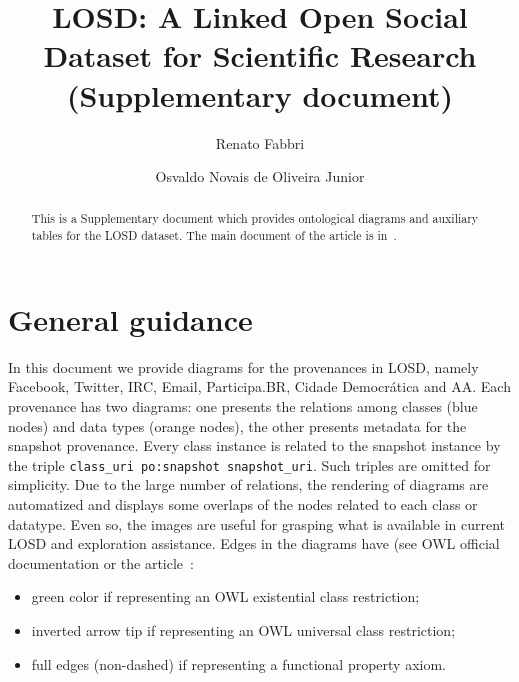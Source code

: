 \documentclass[review]{elsarticle}
\newcommand{\te}[1] {\texttt{\footnotesize#1}}
\begin{document}
%
\begin{frontmatter}
%
\title{LOSD: A Linked Open Social Dataset for Scientific Research
  (Supplementary document)}
%
\author[pwa]{Renato Fabbri}
%
\author[pwr]{Osvaldo Novais de Oliveira Junior}
%
\address[pwa]{
Institute of Mathematical and Computer Sciences, University of São Paulo (ICMC/USP), São Carlos, Brazil
}
\address[pwr]{
São Carlos Institute of Physics, University of São Paulo (IFSC/USP), São Carlos, Brazil
}
%
%
\begin{abstract}
This is a Supplementary document which provides ontological
diagrams and auxiliary tables for the LOSD dataset.
The main document of the article is in~\cite{losd}.
\end{abstract}
%
\end{frontmatter}
\newcommand{\foo}{\textheight}
\newcommand{\foobar}{\pdfpageheight}
\tableofcontents
\clearpage
\section{General guidance}
In this document we provide diagrams
for the provenances in LOSD, namely
Facebook, Twitter, IRC, Email, Participa.BR, Cidade Democrática and AA.
Each provenance has two diagrams: one presents the relations
among classes (blue nodes) and data types (orange nodes),
the other presents metadata for the snapshot provenance.
Every class instance is related to the snapshot instance
by the triple \te{class\_uri po:snapshot snapshot\_uri}.
Such triples are omitted for simplicity.
Due to the large number of relations, the rendering of diagrams are
automatized and displays some overlaps of the nodes related to each class or datatype.
Even so, the images are useful for grasping what is available in current LOSD
and exploration assistance.
Edges in the diagrams have (see OWL official documentation or the article~\cite{losd}:
\begin{itemize}
    \item green color if representing an OWL existential
class restriction;
    \item inverted arrow tip if representing an OWL universal class
        restriction;
    \item full edges (non-dashed) if representing a functional property
        axiom.
\end{itemize}
\end{document}
